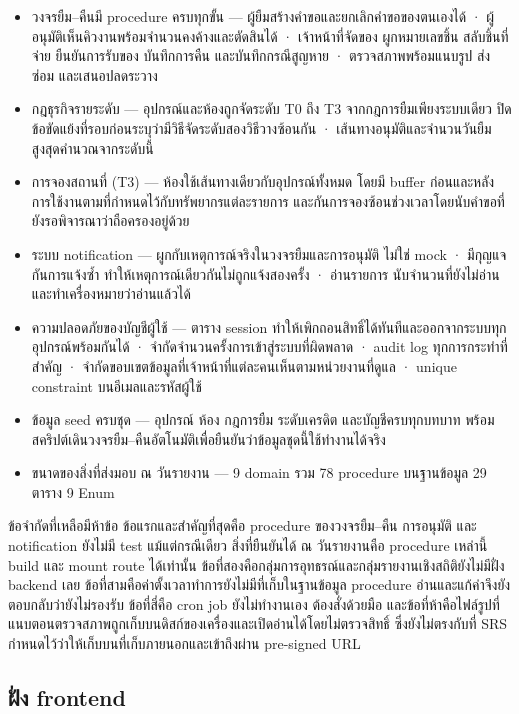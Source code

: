 \begin{itemize}
 \item วงจรยืม–คืนมี procedure ครบทุกขั้น — ผู้ยืมสร้างคำขอและยกเลิกคำขอของตนเองได้ · ผู้อนุมัติเห็นคิวงานพร้อมจำนวนคงค้างและตัดสินได้ · เจ้าหน้าที่จัดของ ผูกหมายเลขชิ้น สลับชิ้นที่จ่าย ยืนยันการรับของ บันทึกการคืน และบันทึกกรณีสูญหาย · ตรวจสภาพพร้อมแนบรูป ส่งซ่อม และเสนอปลดระวาง
 \item กฎธุรกิจรายระดับ — อุปกรณ์และห้องถูกจัดระดับ T0 ถึง T3 จากกฎการยืมเพียงระบบเดียว ปิดข้อขัดแย้งที่รอบก่อนระบุว่ามีวิธีจัดระดับสองวิธีวางซ้อนกัน · เส้นทางอนุมัติและจำนวนวันยืมสูงสุดคำนวณจากระดับนี้
 \item การจองสถานที่ (T3) — ห้องใช้เส้นทางเดียวกับอุปกรณ์ทั้งหมด โดยมี buffer ก่อนและหลังการใช้งานตามที่กำหนดไว้กับทรัพยากรแต่ละรายการ และกันการจองซ้อนช่วงเวลาโดยนับคำขอที่ยังรอพิจารณาว่าถือครองอยู่ด้วย
 \item ระบบ notification — ผูกกับเหตุการณ์จริงในวงจรยืมและการอนุมัติ ไม่ใช่ mock · มีกุญแจกันการแจ้งซ้ำ ทำให้เหตุการณ์เดียวกันไม่ถูกแจ้งสองครั้ง · อ่านรายการ นับจำนวนที่ยังไม่อ่าน และทำเครื่องหมายว่าอ่านแล้วได้
 \item ความปลอดภัยของบัญชีผู้ใช้ — ตาราง session ทำให้เพิกถอนสิทธิ์ได้ทันทีและออกจากระบบทุกอุปกรณ์พร้อมกันได้ · จำกัดจำนวนครั้งการเข้าสู่ระบบที่ผิดพลาด · audit log ทุกการกระทำที่สำคัญ · จำกัดขอบเขตข้อมูลที่เจ้าหน้าที่แต่ละคนเห็นตามหน่วยงานที่ดูแล · unique constraint บนอีเมลและรหัสผู้ใช้
 \item ข้อมูล seed ครบชุด — อุปกรณ์ ห้อง กฎการยืม ระดับเครดิต และบัญชีครบทุกบทบาท พร้อมสคริปต์เดินวงจรยืม–คืนอัตโนมัติเพื่อยืนยันว่าข้อมูลชุดนี้ใช้ทำงานได้จริง
 \item ขนาดของสิ่งที่ส่งมอบ ณ วันรายงาน — 9 domain รวม 78 procedure บนฐานข้อมูล 29 ตาราง 9 Enum
\end{itemize}

ข้อจำกัดที่เหลือมีห้าข้อ ข้อแรกและสำคัญที่สุดคือ procedure ของวงจรยืม–คืน การอนุมัติ และ notification ยังไม่มี test แม้แต่กรณีเดียว สิ่งที่ยืนยันได้ ณ วันรายงานคือ procedure เหล่านี้ build และ mount route ได้เท่านั้น ข้อที่สองคือกลุ่มการอุทธรณ์และกลุ่มรายงานเชิงสถิติยังไม่มีฝั่ง backend เลย ข้อที่สามคือค่าตั้งเวลาทำการยังไม่มีที่เก็บในฐานข้อมูล procedure อ่านและแก้ค่าจึงยังตอบกลับว่ายังไม่รองรับ ข้อที่สี่คือ cron job ยังไม่ทำงานเอง ต้องสั่งด้วยมือ และข้อที่ห้าคือไฟล์รูปที่แนบตอนตรวจสภาพถูกเก็บบนดิสก์ของเครื่องและเปิดอ่านได้โดยไม่ตรวจสิทธิ์ ซึ่งยังไม่ตรงกับที่ SRS กำหนดไว้ว่าให้เก็บบนที่เก็บภายนอกและเข้าถึงผ่าน pre-signed URL

\subsection{ฝั่ง frontend}

